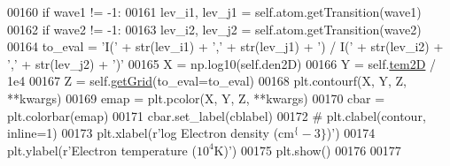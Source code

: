 \begin{DoxyCode}
00160             \textcolor{keywordflow}{if} wave1 != -1:
00161                 lev\_i1, lev\_j1 = self.atom.getTransition(wave1)
00162             \textcolor{keywordflow}{if} wave2 != -1:
00163                 lev\_i2, lev\_j2 = self.atom.getTransition(wave2)
00164             to\_eval = \textcolor{stringliteral}{'I('} + str(lev\_i1) + \textcolor{stringliteral}{','} + str(lev\_j1) + \textcolor{stringliteral}{') / I('} + str(lev\_i2) + \textcolor{stringliteral}{','} + str(lev\_j2) +
       \textcolor{stringliteral}{')'}
00165         X = np.log10(self.den2D)
00166         Y = self.\hyperlink{classpyneb_1_1core_1_1emis_grid_1_1_emis_grid_ae1904aecb62ca67772b3998cca09fabd}{tem2D} / 1e4
00167         Z = self.\hyperlink{classpyneb_1_1core_1_1emis_grid_1_1_emis_grid_af9a9219e5ddfcfd53c52466e2c2deb44}{getGrid}(to\_eval=to\_eval)
00168         plt.contourf(X, Y, Z, **kwargs)
00169         emap = plt.pcolor(X, Y, Z, **kwargs)
00170         cbar = plt.colorbar(emap)
00171         cbar.set\_label(cblabel)
00172         \textcolor{comment}{# plt.clabel(contour, inline=1)}
00173         plt.xlabel(\textcolor{stringliteral}{r'log Electron density (cm$^\{-3\}$)'})
00174         plt.ylabel(\textcolor{stringliteral}{r'Electron temperature ($10^4$K)'})
00175         plt.show()
00176 
00177 
\end{DoxyCode}
\hypertarget{classpyneb_1_1core_1_1emis_grid_1_1_emis_grid_a26aabc41fbb077d204e64f379e5ec5f7}{}
